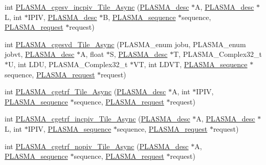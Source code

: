 \begin{DoxyCompactItemize}
\item 
int \hyperlink{group__PLASMA__Complex32__t__Tile__Async_gab4722567489b91ac36ee04e8c2a65620_gab4722567489b91ac36ee04e8c2a65620}{P\+L\+A\+S\+M\+A\+\_\+cgesv\+\_\+incpiv\+\_\+\+Tile\+\_\+\+Async} (\hyperlink{structplasma__desc__t}{P\+L\+A\+S\+M\+A\+\_\+desc} $\ast$A, \hyperlink{structplasma__desc__t}{P\+L\+A\+S\+M\+A\+\_\+desc} $\ast$L, int $\ast$I\+P\+I\+V, \hyperlink{structplasma__desc__t}{P\+L\+A\+S\+M\+A\+\_\+desc} $\ast$B, \hyperlink{structplasma__sequence__t}{P\+L\+A\+S\+M\+A\+\_\+sequence} $\ast$sequence, \hyperlink{structplasma__request__t}{P\+L\+A\+S\+M\+A\+\_\+request} $\ast$request)
\item 
int \hyperlink{group__PLASMA__Complex32__t__Tile__Async_ga830b58fffa9b7118ef48606313729571_ga830b58fffa9b7118ef48606313729571}{P\+L\+A\+S\+M\+A\+\_\+cgesvd\+\_\+\+Tile\+\_\+\+Async} (P\+L\+A\+S\+M\+A\+\_\+enum jobu, P\+L\+A\+S\+M\+A\+\_\+enum jobvt, \hyperlink{structplasma__desc__t}{P\+L\+A\+S\+M\+A\+\_\+desc} $\ast$A, float $\ast$S, \hyperlink{structplasma__desc__t}{P\+L\+A\+S\+M\+A\+\_\+desc} $\ast$T, P\+L\+A\+S\+M\+A\+\_\+\+Complex32\+\_\+t $\ast$U, int L\+D\+U, P\+L\+A\+S\+M\+A\+\_\+\+Complex32\+\_\+t $\ast$V\+T, int L\+D\+V\+T, \hyperlink{structplasma__sequence__t}{P\+L\+A\+S\+M\+A\+\_\+sequence} $\ast$sequence, \hyperlink{structplasma__request__t}{P\+L\+A\+S\+M\+A\+\_\+request} $\ast$request)
\item 
int \hyperlink{group__PLASMA__Complex32__t__Tile__Async_gad07cc0f567f348a1e5bfbfbb7637e0a6_gad07cc0f567f348a1e5bfbfbb7637e0a6}{P\+L\+A\+S\+M\+A\+\_\+cgetrf\+\_\+\+Tile\+\_\+\+Async} (\hyperlink{structplasma__desc__t}{P\+L\+A\+S\+M\+A\+\_\+desc} $\ast$A, int $\ast$I\+P\+I\+V, \hyperlink{structplasma__sequence__t}{P\+L\+A\+S\+M\+A\+\_\+sequence} $\ast$sequence, \hyperlink{structplasma__request__t}{P\+L\+A\+S\+M\+A\+\_\+request} $\ast$request)
\item 
int \hyperlink{group__PLASMA__Complex32__t__Tile__Async_ga0cdd633a67a1ee67ba5ea168a73b18ee_ga0cdd633a67a1ee67ba5ea168a73b18ee}{P\+L\+A\+S\+M\+A\+\_\+cgetrf\+\_\+incpiv\+\_\+\+Tile\+\_\+\+Async} (\hyperlink{structplasma__desc__t}{P\+L\+A\+S\+M\+A\+\_\+desc} $\ast$A, \hyperlink{structplasma__desc__t}{P\+L\+A\+S\+M\+A\+\_\+desc} $\ast$L, int $\ast$I\+P\+I\+V, \hyperlink{structplasma__sequence__t}{P\+L\+A\+S\+M\+A\+\_\+sequence} $\ast$sequence, \hyperlink{structplasma__request__t}{P\+L\+A\+S\+M\+A\+\_\+request} $\ast$request)
\item 
int \hyperlink{group__PLASMA__Complex32__t__Tile__Async_ga440035a8e5e9389f6134b8c78b338f1f_ga440035a8e5e9389f6134b8c78b338f1f}{P\+L\+A\+S\+M\+A\+\_\+cgetrf\+\_\+nopiv\+\_\+\+Tile\+\_\+\+Async} (\hyperlink{structplasma__desc__t}{P\+L\+A\+S\+M\+A\+\_\+desc} $\ast$A, \hyperlink{structplasma__sequence__t}{P\+L\+A\+S\+M\+A\+\_\+sequence} $\ast$sequence, \hyperlink{structplasma__request__t}{P\+L\+A\+S\+M\+A\+\_\+request} $\ast$request)

\end{DoxyCompactItemize}
